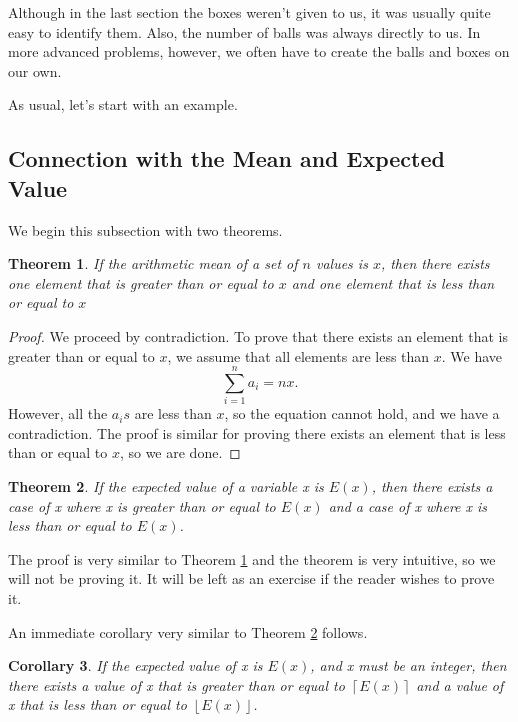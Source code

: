 \documentclass[l1pt]{article}
\theoremstyle{plain}
\newtheorem{thm}{Theorem}[section]
\newtheorem{corollary}[thm]{Corollary}
\theoremstyle{definition}
\theoremstyle{remark}
\begin{document}
Although in the last section the boxes weren't given to us, it was usually quite easy to identify them. Also, the number of balls was always directly to us. In more advanced problems, however, we often have to create the balls and boxes on our own. 

As usual, let's start with an example.

\subsection{Connection with the Mean and Expected Value}
We begin this subsection with two theorems.

\begin{mdframed}
    \begin{thm}
    \label{thm:arithmetic mean}
    If the arithmetic mean of a set of $n$ values is $x$, then there exists one element that is greater than or equal to $x$ and one element that is less than or equal to $x$
    \end{thm}
\end{mdframed}

\begin{proof}
We proceed by contradiction. To prove that there exists an element that is greater than or equal to $x$, we assume that all elements are less than $x$. We have \[\sum_{i=1}^n a_i=nx .\] However, all the $a_is$ are less than $x$, so the equation cannot hold, and we have a contradiction. The proof is similar for proving there exists an element that is less than or equal to $x$, so we are done.
\end{proof}

\begin{mdframed}
    \begin{thm}
    \label{thm:expected value}
    If the expected value of a variable x is $E(x)$, then there exists a case of x where x is greater than or equal to $E(x)$ and a case of x where x is less than or equal to $E(x)$.
    \end{thm}
\end{mdframed}

The proof is very similar to Theorem \ref{thm:arithmetic mean} and the theorem is very intuitive, so we will not be proving it. It will be left as an exercise if the reader wishes to prove it. 

An immediate corollary very similar to Theorem \ref{thm:expected value} follows.

\begin{mdframed}
    \begin{corollary}
    If the expected value of x is $E(x)$, and x must be an integer, then there exists a value of x that is greater than or equal to $\left \lceil{E(x)}\right \rceil$ and a value of x that is less than or equal to $\left \lfloor{E(x)}\right \rfloor $.
    \end{corollary}
\end{mdframed}
\end{document}
